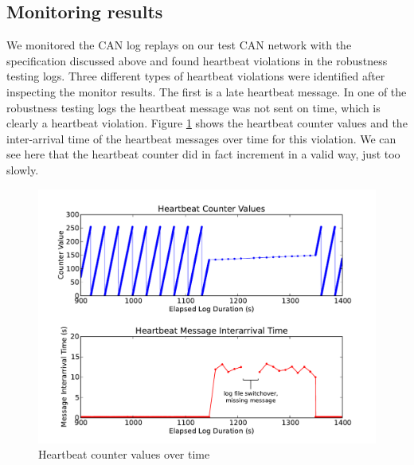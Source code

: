 \subsection{Monitoring results}
We monitored the CAN log replays on our test CAN network with the specification discussed above and found heartbeat violations in the robustness testing logs.
%
Three different types of heartbeat violations were identified after inspecting the monitor results.
The first is a late heartbeat message. In one of the robustness testing logs the heartbeat message was not sent on time, which is clearly a heartbeat violation. Figure \ref{fig:eval:hb_arrival:vals} shows the heartbeat counter values and the inter-arrival time of the heartbeat messages over time for this violation. We can see here that the heartbeat counter did in fact increment in a valid way, just too slowly. 

\begin{figure}
		\includegraphics[width=4.5in]{img/hb1}
		\caption{Heartbeat counter values over time}
		\label{fig:eval:hb_arrival:vals}
\end{figure}

